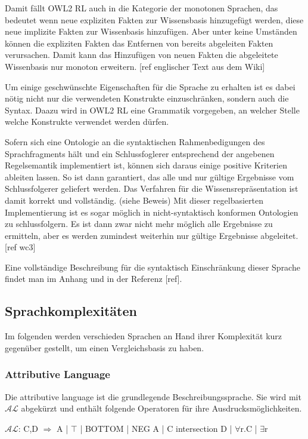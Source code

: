 Damit fällt OWL2 RL auch in die Kategorie der monotonen Sprachen, das bedeutet wenn neue expliziten Fakten zur Wissensbasis hinzugefügt werden, diese neue implizite Fakten zur Wissenbasis hinzufügen. Aber unter keine Umständen können die expliziten Fakten das Entfernen von bereits abgeleiten Fakten verursachen. Damit kann das Hinzufügen von neuen Fakten die abgeleitete Wissenbasis nur monoton erweitern. [ref englischer Text aus dem Wiki]

Um einige geschwünschte Eigenschaften für die Sprache zu erhalten ist es dabei nötig nicht nur die verwendeten Konstrukte einzuschränken, sondern auch die Syntax. Daazu wird in OWL2 RL eine Grammatik vorgegeben, an welcher Stelle welche Konstrukte verwendet werden dürfen.

Sofern sich eine Ontologie an die syntaktischen Rahmenbedigungen des Sprachfragments hält und ein Schlussfoglerer entsprechend der angebenen Regelsemantik implementiert ist, können sich daraus einige positive Kriterien ableiten lassen. So ist dann garantiert, das alle und nur gültige Ergebnisse vom Schlussfolgerer geliefert werden. Das Verfahren für die Wissensrepräsentation ist damit korrekt und vollständig. (siehe Beweis)
Mit dieser regelbasierten Implementierung ist es sogar möglich in nicht-syntaktisch konformen Ontologien zu schlussfolgern. Es ist dann zwar nicht mehr möglich alle Ergebnisse zu ermitteln, aber es werden zumindest weiterhin nur gültige Ergebnisse abgeleitet. [ref wc3]

Eine vollständige Beschreibung für die syntaktisch Einschränkung dieser Sprache findet man im Anhang und in der Referenz [ref].

\subsection{Sprachkomplexitäten}
Im folgenden werden verschieden Sprachen an Hand ihrer Komplexität kurz gegenüber gestellt, um einen Vergleichsbasis zu haben.

\subsubsection{Attributive Language}
Die attributive language ist die grundlegende Beschreibungssprache. Sie wird mit $\mathcal{AL}$ abgekürzt und enthält folgende Operatoren für ihre Ausdrucksmöglichkeiten.

$\mathcal{AL}$: C,D $\Longrightarrow$ A | $\top$ | BOTTOM | NEG A | C intersection D | $\forall$r.C | $\exists$r

